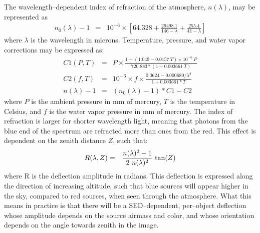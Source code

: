 \documentclass[prd, nofootinbib, floatfix, 11pt, tightenlines, times]{article}
\begin{document}
The wavelength--dependent index of refraction of the atmosphere,
$n(\lambda)$, may be represented as
\begin{eqnarray}
\label{eqn:dcr0}
n_0(\lambda) - 1 & = & 10^{-6} \times \left[ 64.328 + \frac{29498.1}{146 - \lambda} + \frac{255.4}{41 - \lambda} \right]
\end{eqnarray}
where $\lambda$ is the wavelength in microns.  Temperature, pressure,
and water vapor corrections may be expressed as:
\begin{eqnarray}
\label{eqn:dcr}
C1(P,T) & = & P \times \frac{1 + (1.049 - 0.0157~T) \times 10^{-6}~P}{720.883 * (1 + 0.003661~T)} \\
C2(f,T) & = & 10^{-6} \times f \times \frac{0.0624 - 0.000680/\lambda^2}{1 + 0.003661 * T} \\
n(\lambda) - 1 & = & (n_0(\lambda) - 1) * C1 - C2 
\end{eqnarray}
where $P$ is the ambient pressure in mm of mercury, $T$ is the
temperature in Celsius, and $f$ is the water vapor pressure in mm of
mercury.  The index of refraction is larger for shorter wavelength
light, meaning that photons from the blue end of the spectrum are
refracted more than ones from the red.  This effect is dependent on
the zenith distance $Z$, such that:
\begin{eqnarray}
R(\lambda, Z) & = & \frac{n(\lambda)^2 - 1}{2~n(\lambda)^2}~{\rm tan}(Z)
\end{eqnarray}
where R is the deflection amplitude in radians.  This deflection is
expressed along the direction of increasing altitude, such that blue
sources will appear higher in the sky, compared to red sources, when
seen through the atmosphere.  What this means in practice is that
there will be a SED--dependent, per--object deflection whose amplitude
depends on the source airmass and color, and whose orientation depends
on the angle towards zenith in the image.
\end{document}
